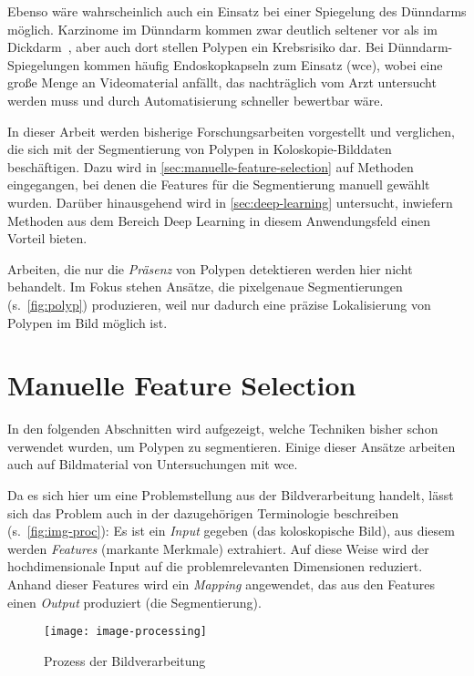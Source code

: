 Ebenso wäre wahrscheinlich auch ein Einsatz bei einer Spiegelung des Dünndarms möglich.
Karzinome im Dünndarm kommen zwar deutlich seltener vor als im Dickdarm~\cite{Kumar.2005}, aber auch dort stellen Polypen ein Krebsrisiko dar.
Bei Dünndarm-Spiegelungen kommen häufig Endoskopkapseln zum Einsatz (\gls{wce}), wobei eine große Menge an Videomaterial anfällt, das nachträglich vom Arzt untersucht werden muss und durch Automatisierung schneller bewertbar wäre.

In dieser Arbeit werden bisherige Forschungsarbeiten vorgestellt und verglichen, die sich mit der Segmentierung von Polypen in Koloskopie-Bilddaten beschäftigen.
Dazu wird in \autoref{sec:manuelle-feature-selection} auf Methoden eingegangen, bei denen die Features für die Segmentierung manuell gewählt wurden.
Darüber hinausgehend wird in \autoref{sec:deep-learning} untersucht, inwiefern Methoden aus dem Bereich Deep Learning in diesem Anwendungsfeld einen Vorteil bieten.

Arbeiten, die nur die \emph{Präsenz} von Polypen detektieren werden hier nicht behandelt.
Im Fokus stehen Ansätze, die pixelgenaue Segmentierungen (s.~\autoref{fig:polyp}) produzieren, weil nur dadurch eine präzise Lokalisierung von Polypen im Bild möglich ist.



\section{Manuelle Feature Selection}\label{sec:manuelle-feature-selection}

In den folgenden Abschnitten wird aufgezeigt, welche Techniken bisher schon verwendet wurden, um Polypen zu segmentieren.
Einige dieser Ansätze arbeiten auch auf Bildmaterial von Untersuchungen mit \gls{wce}.

Da es sich hier um eine Problemstellung aus der Bildverarbeitung handelt, lässt sich das Problem auch in der dazugehörigen Terminologie beschreiben (s.~\autoref{fig:img-proc}):
Es ist ein \emph{Input} gegeben (das koloskopische Bild), aus diesem werden \emph{Features} (markante Merkmale) extrahiert.
Auf diese Weise wird der hochdimensionale Input auf die problemrelevanten Dimensionen reduziert.
Anhand dieser Features wird ein \emph{Mapping} angewendet, das aus den Features einen \emph{Output} produziert (die Segmentierung).

\begin{figure}[h]
	\centering
	\texttt{[image: image-processing]}
	\caption{Prozess der Bildverarbeitung}
	\label{fig:img-proc}
\end{figure}

